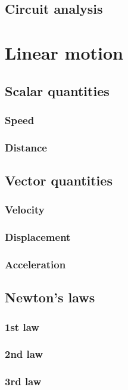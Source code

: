 \documentclass{book}
\begin{document}
\section{Circuit analysis}



\chapter{Linear motion}
\section{Scalar quantities}
\subsection{Speed}

\subsection{Distance}


\section{Vector quantities}
\subsection{Velocity}

\subsection{Displacement}

\subsection{Acceleration}


\section{Newton's laws}
\subsection{1st law}

\subsection{2nd law}

\subsection{3rd law}
\end{document}
